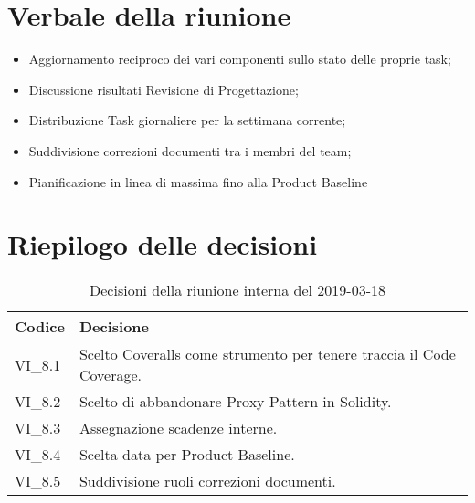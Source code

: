 \section{Verbale della riunione}
\begin{itemize}
	\item Aggiornamento reciproco dei vari componenti sullo stato delle proprie 
	task;
	\item Discussione risultati Revisione di Progettazione;
	\item Distribuzione Task giornaliere per la settimana corrente;
	\item Suddivisione correzioni documenti tra i membri del team;
	\item Pianificazione in linea di massima fino alla Product Baseline
	
\end{itemize}

\hspace{3cm}

\section{Riepilogo delle decisioni}

	
	\begin{longtable}{ >{\centering}p{} >{}p{}}
		\caption{Decisioni della riunione interna del 2019-03-18}\\	
		\rowcolorhead
		\textbf{\color{white}Codice} 
		& \centering\textbf{\color{white}Decisione} 
		\tabularnewline 
		\endfirsthead
		VI\_8.1 & Scelto Coveralls come strumento per tenere traccia il Code Coverage.
		\tabularnewline 
		VI\_8.2 & Scelto di abbandonare Proxy Pattern in Solidity.
		\tabularnewline 
		VI\_8.3 & Assegnazione scadenze interne.
		\tabularnewline 
		VI\_8.4 & Scelta data per Product Baseline.
		\tabularnewline
		VI\_8.5 & Suddivisione ruoli correzioni documenti.\\
		
	\end{longtable}
	




